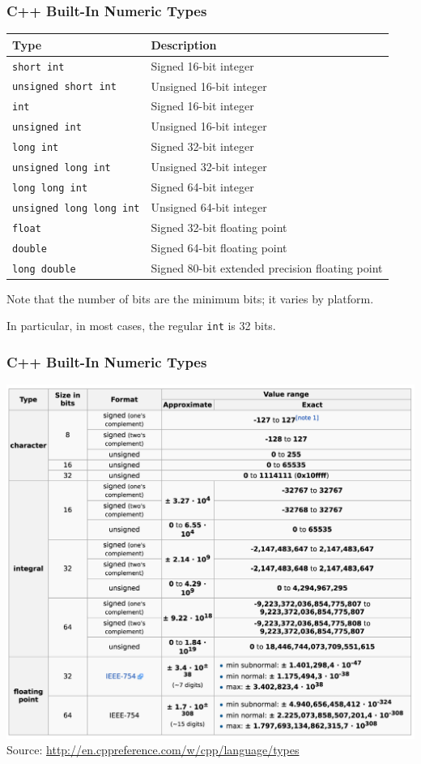 \begin{frame}
\frametitle{C++ Built-In Numeric Types}
\begin{center}
{\scriptsize
\begin{tabular}{l|l}
\textbf{Type} & \textbf{Description}\\ \hline
\texttt{short int} & Signed 16-bit integer\\ \hline
\texttt{unsigned short int} & Unsigned 16-bit integer\\ \hline
\texttt{int} & Signed 16-bit integer\\ \hline
\texttt{unsigned int} & Unsigned 16-bit integer\\ \hline
\texttt{long int} & Signed 32-bit integer\\ \hline
\texttt{unsigned long int} & Unsigned 32-bit integer\\ \hline
\texttt{long long int} & Signed 64-bit integer\\ \hline
\texttt{unsigned long long int} & Unsigned 64-bit integer\\ \hline
\texttt{float} & Signed 32-bit floating point\\ \hline
\texttt{double} & Signed 64-bit floating point\\ \hline
\texttt{long double} & Signed 80-bit extended precision floating point\\
\end{tabular}
}
\end{center}

Note that the number of bits are the minimum bits; it varies by platform.

In particular, in most cases, the regular \texttt{int} is 32 bits.

\end{frame}

\begin{frame}
\frametitle{C++ Built-In Numeric Types}

\begin{center}
\includegraphics[width=.78\textwidth]{images/cppvaluerange.png}\\
{\scriptsize Source: \url{http://en.cppreference.com/w/cpp/language/types}}
\end{center}



\end{frame}


